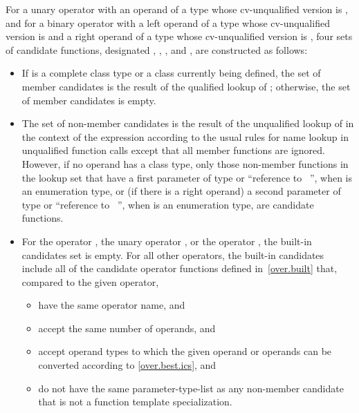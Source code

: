 \pnum
For a unary operator
with an operand of a type whose cv-unqualified version is
,
and for a binary operator
with a left operand of a type whose cv-unqualified version is
and a right operand of a type whose cv-unqualified version is
,
four sets of candidate functions, designated
,
,
,
and
,
are constructed as follows:
\begin{itemize}
\item
If
is a complete class type or a class currently being defined, the set of member candidates is the
result of the qualified lookup of
; otherwise, the set of member
candidates is empty.
\item
The set of non-member candidates is the result of the unqualified lookup of
in the context of
the expression according to the usual rules for name
lookup in unqualified function calls except
that all member functions are ignored.
However, if no operand has a class type, only those non-member
functions in the lookup set that have a first parameter of type
or ``reference to \cv{}~'',
when
is an enumeration type,
or (if there is a right operand) a second parameter of type
or ``reference to \cv{}~'',
when
is an enumeration type,
are candidate functions.
\item
For the operator
\tcode{,},
the unary operator
\tcode{\&},
or the operator
\tcode{->},
the built-in candidates set is empty.
For all other operators, the built-in candidates include all
of the candidate operator functions defined in~\ref{over.built} that,
compared to the given operator,

\begin{itemize}
\item
have the same operator name, and
\item
accept the same number of operands, and
\item
accept operand types to which the given operand or
operands can be converted according to \ref{over.best.ics}, and
\item
do not have the same parameter-type-list as any non-member candidate
that is not a function template specialization.
\end{itemize}


\end{itemize}
